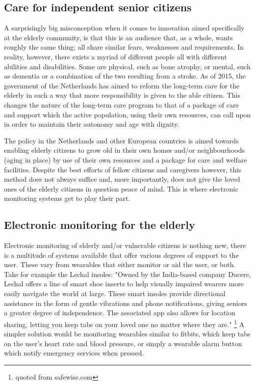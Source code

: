 \documentclass{below-ext}
\begin{document}
\subsection{Care for independent senior citizens}

A surprisingly big misconception when it comes to innovation aimed specifically at the elderly community, is that this is an audience that, as a whole, wants roughly the same thing; all share similar fears, weaknesses and requirements. In reality, however, there exists a myriad of different people all with different abilities and disabilities. Some are physical, such as bone atrophy, or mental, such as dementia or a combination of the two resulting from a stroke\cite{waag}. As of 2015, the government of the Netherlands has aimed to reform the long-term care for the elderly in such a way that more responsibility is given to the able citizen. This changes the nature of the long-term care program to that of a package of care and support which the active population, using their own resources, can call upon in order to maintain their autonomy and age with dignity\cite{langerzelfstandig}.

The policy in the Netherlands and other European countries is aimed towards enabling elderly citizens to grow old in their own homes and/or neighbourhoods (aging in place) by use of their own resources and a package for care and welfare facilities. \cite{thomas_blanchard} Despite the best efforts of fellow citizens and caregivers however, this method does not always suffice and, more importantly, does not give the loved ones of the elderly citizens in question peace of mind. This is where electronic monitoring systems get to play their part.


\subsection{Electronic monitoring for the elderly}
Electronic monitoring of elderly and/or vulnerable citizens is nothing new, there is a multitude of systems available that offer various degrees of support to the user. These vary from wearables that either monitor or aid the user, or both. Take for example the Lechal insoles: "Owned by the India-based company Ducere, Lechal offers a line of smart shoe inserts to help visually impaired wearers more easily navigate the world at large. These smart insoles provide directional assistance in the form of gentle vibrations and phone notifications, giving seniors a greater degree of independence. The associated app also allows for location sharing, letting you keep tabs on your loved one no matter where they are." \footnote{quoted from safewise.com} A simpler solution would be monitoring wearables similar to fitbits, which keep tabs on the user's heart rate and blood pressure, or simply a wearable alarm button which notify emergency services when pressed.
\end{document}

